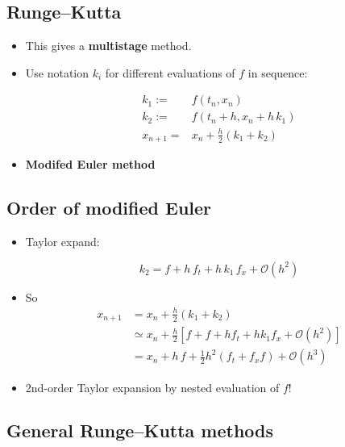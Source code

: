 \documentclass[
]{article}
\begin{document}
\hypertarget{rungekutta}{%
\subsection{Runge--Kutta}\label{rungekutta}}

\begin{itemize}
\item
  This gives a \textbf{multistage} method.
\item
  Use notation \(k_i\) for different evaluations of \(f\) in sequence:

  \begin{align*}
    k_1 :=& f(t_n, x_n)  \\
    k_2 :=& f(t_n + h, x_n + h \, k_1) \\
    x_{n+1} =& x_n + \textstyle \frac{h}{2} (k_1 + k_2)
    \end{align*}
\item
  \textbf{Modifed Euler method}
\end{itemize}

\hypertarget{order-of-modified-euler}{%
\subsection{Order of modified Euler}\label{order-of-modified-euler}}

\begin{itemize}
\item
  Taylor expand:

  \[k_2 = f + h \, f_t + h \, k_1 \, f_x + \mathcal{O}(h^2)\]
\item
  So \begin{align*}
    x_{n+1} &= x_n + \textstyle \frac{h}{2} (k_1 + k_2) \\
    & \simeq x_n + \textstyle \frac{h}{2} \left[ f + f + h f_t + h k_1 f_x + \mathcal{O}(h^2) \right] \\
    &= x_n + h \, f + \textstyle \frac{1}{2} h^2 (f_t + f_x f) + \mathcal{O}(h^3)
    \end{align*}
\item
  2nd-order Taylor expansion by nested evaluation of \(f\)!
\end{itemize}

\hypertarget{general-rungekutta-methods}{%
\subsection{General Runge--Kutta
methods}\label{general-rungekutta-methods}}
\end{document}
